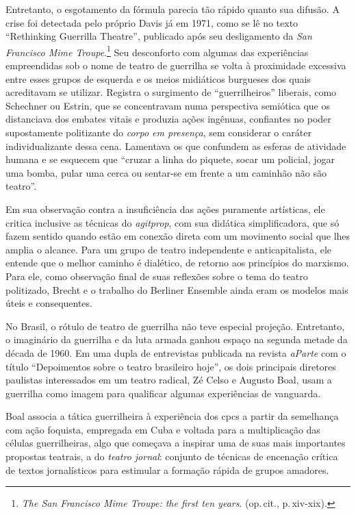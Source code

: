 Entretanto, o esgotamento da fórmula parecia tão rápido quanto sua
difusão. A crise foi detectada pelo próprio Davis já em 1971, como se lê
no texto “Rethinking Guerrilla Theatre”, publicado após seu
desligamento da {\it San Francisco Mime Troupe}.\footnote{{\it The San Francisco Mime Troupe: the first ten years}.
  (op.\,cit., p.\,xiv-xix).} Seu desconforto com algumas das experiências
empreendidas sob o nome de teatro de guerrilha se volta à
proximidade excessiva entre esses grupos de esquerda e os meios
midiáticos burgueses dos quais acreditavam se utilizar. Registra o
surgimento de “guerrilheiros” liberais, como Schechner ou Estrin, que se
concentravam numa perspectiva semiótica que os distanciava dos embates
vitais e produzia ações ingênuas, confiantes no poder supostamente
politizante do {\it corpo em presença}, sem considerar o caráter
individualizante dessa cena. Lamentava os que confundem as esferas de
atividade humana e se esquecem que “cruzar a linha do piquete, socar um
policial, jogar uma bomba, pular uma cerca ou sentar-se em frente a um
caminhão não são teatro”.

Em sua observação contra a insuficiência das ações puramente artísticas,
ele critica inclusive as técnicas do {\it agitprop}, com sua didática
simplificadora, que só fazem sentido quando estão em conexão direta com
um movimento social que lhes amplia o alcance. Para um grupo de teatro
independente e anticapitalista, ele entende que o melhor caminho é
dialético, de retorno aos princípios do marxismo. Para ele, como
observação final de suas reflexões sobre o tema do teatro politizado,
Brecht e o trabalho do Berliner Ensemble ainda eram os modelos mais
úteis e consequentes.

\subject{Brasil: a guerrilha no teatro}

No Brasil, o rótulo de teatro de guerrilha não teve especial projeção.
Entretanto, o imaginário da guerrilha e da luta armada ganhou espaço na
segunda metade da década de 1960. Em uma dupla de entrevistas publicada
na revista {\it aParte} com o título “Depoimentos sobre o teatro
brasileiro hoje”, os dois principais diretores paulistas interessados em
um teatro radical, Zé Celso e Augusto Boal, usam a guerrilha como imagem
para qualificar algumas experiências de vanguarda.

Boal associa a tática guerrilheira à experiência dos {\sc cpc}s a partir da
semelhança com ação foquista, empregada em Cuba e voltada para a
multiplicação das células guerrilheiras, algo que começava
a inspirar uma de suas mais importantes propostas teatrais, a do
{\it teatro jornal}: conjunto de técnicas de encenação crítica de textos
jornalísticos para estimular a formação rápida de grupos
amadores.

